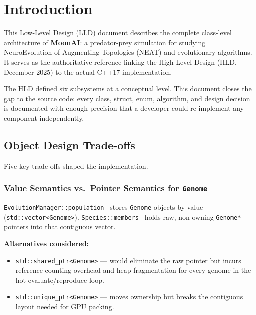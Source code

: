 \section{Introduction}
\label{sec:intro}

This Low-Level Design (LLD) document describes the complete class-level architecture of
\textbf{MoonAI}: a predator-prey simulation for studying NeuroEvolution of Augmenting
Topologies (NEAT) and evolutionary algorithms.  It serves as the authoritative reference
linking the High-Level Design (HLD, December 2025) to the actual C++17 implementation.

The HLD defined six subsystems at a conceptual level.  This document closes the gap to the
source code: every class, struct, enum, algorithm, and design decision is documented with
enough precision that a developer could re-implement any component independently.

\subsection{Object Design Trade-offs}
\label{sec:tradeoffs}

Five key trade-offs shaped the implementation.

\subsubsection{Value Semantics vs.\ Pointer Semantics for \texttt{Genome}}

\texttt{EvolutionManager::population\_} stores \texttt{Genome} objects by value
(\texttt{std::vector<Genome>}).  \texttt{Species::members\_} holds raw, non-owning
\texttt{Genome*} pointers into that contiguous vector.

\textbf{Alternatives considered:}
\begin{itemize}[nosep]
  \item \texttt{std::shared\_ptr<Genome>} — would eliminate the raw pointer but incurs
    reference-counting overhead and heap fragmentation for every genome in the hot
    evaluate/reproduce loop.
  \item \texttt{std::unique\_ptr<Genome>} — moves ownership but breaks the contiguous
    layout needed for GPU packing.
\end{itemize}

